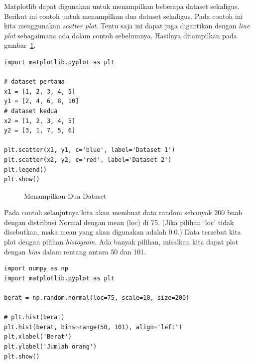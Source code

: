 Matplotlib dapat digunakan untuk menampilkan beberapa dataset sekaligus.
Berikut ini contoh untuk menampilkan dua dataset sekaligus.
Pada contoh ini kita menggunakan {\em scatter plot}. Tentu saja ini dapat
juga digantikan dengan {\em line plot} sebagaimana ada dalam contoh sebelumnya.
Hasilnya ditampilkan pada gambar~\ref{fig:contoh2}.

\begin{verbatim}
import matplotlib.pyplot as plt

# dataset pertama
x1 = [1, 2, 3, 4, 5]
y1 = [2, 4, 6, 8, 10]
# dataset kedua
x2 = [1, 2, 3, 4, 5]
y2 = [3, 1, 7, 5, 6]

plt.scatter(x1, y1, c='blue', label='Dataset 1')
plt.scatter(x2, y2, c='red', label='Dataset 2')
plt.legend()
plt.show()
\end{verbatim}

\begin{figure}[ht]
   \caption{Menampilkan Dua Dataset}
   \label{fig:contoh2}
\end{figure}

Pada contoh selanjutnya kita akan membuat data random sebanyak 200 buah
dengan distribusi Normal dengan mean (loc) di 75.
(Jika pilihan `loc' tidak disebutkan, maka mean yang akan digunakan adalah 0.0.)
Data tersebut kita plot dengan pilihan {\em histogram}.
Ada banyak pilihan, misalkan kita dapat plot dengan {\em bins}
dalam rentang antara 50 dan 101.

\begin{verbatim}
import numpy as np
import matplotlib.pyplot as plt

berat = np.random.normal(loc=75, scale=10, size=200)

# plt.hist(berat)
plt.hist(berat, bins=range(50, 101), align='left')
plt.xlabel('Berat')
plt.ylabel('Jumlah orang')
plt.show()
\end{verbatim}

